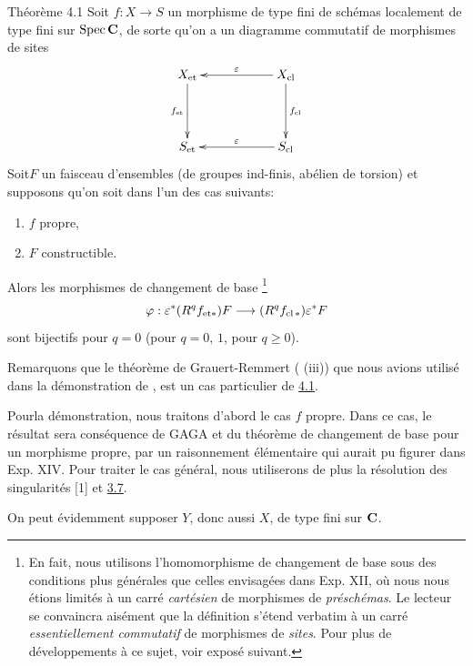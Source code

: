 \documentclass[10pt]{../fichiers-configuration-latex/smfart}
\begin{document}
\begin{enonce*}{Théorème 4.1}
Soit $f:X\rightarrow S$ un morphisme de type fini de schémas
localement de type fini sur $\operatorname{Spec} \mathbf{C}$, de sorte qu'on a un
diagramme commutatif de morphismes de sites
$$
\xymatrix@C=2cm@R=1.5cm{
X_{\et}  \ar[d]_{f_{\et}}                   &   X_{\cl}
\ar[l]_{\varepsilon} \ar[d]^{f_{\cl}} \\
S_{\et}                    &   S_{\cl}\ar[l]_{\varepsilon} 
}
$$
Soit\pageoriginale $F$ un faisceau d'ensembles (\resp de groupes
ind-finis, \resp abélien de torsion) et supposons qu'on soit dans l'un
des cas suivants:
\begin{enumerate}
\renewcommand{\theenumi}{\roman{enumi}}
\renewcommand{\labelenumi}{(\theenumi)}
\item $f$ propre,

\item $F$ constructible.
\end{enumerate}
Alors les morphismes de changement de base 
\footnote[1]{En fait, nous utilisons l'homomorphisme de changement de
base sous des conditions plus générales que celles envisagées dans
Exp. XII, où nous nous étions limités à un carré \emph{cartésien} de
morphismes de \emph{préschémas}. Le lecteur se convaincra aisément que
la définition s'étend verbatim à un carré \emph{essentiellement
commutatif} de morphismes de \emph{sites}. Pour plus de développements
à ce sujet, voir exposé suivant.}
$$
\varphi:\varepsilon^{\ast}(R^{q}f_{\mathrm{et}\ast})F\longrightarrow
(R^{q}f_{\operatorname{cl}\ast})\varepsilon {}^{\ast}F
$$
sont bijectifs pour $q=0$ (\resp pour $q=0$, $1$, \resp pour $q\geq
0$).
\end{enonce*}

Remarquons que le théorème de Grauert-Remmert ( (iii)) que nous
avions utilisé dans la démonstration de , est un cas particulier
de \hyperref[XVI.thm4.1]{4.1}.

Pour\pageoriginale la démonstration, nous traitons d'abord le cas $f$
propre. Dans ce cas, le résultat sera conséquence de GAGA et du
théorème de changement de base pour un morphisme propre, par un
raisonnement élémentaire qui aurait pu figurer dans Exp. XIV. Pour
traiter le cas général, nous utiliserons de plus la résolution des
singularités [1] et \hyperref[XVI.thm3.7]{3.7}.

On peut évidemment supposer $Y$, donc aussi $X$, de type fini sur
$\mathbf{C}$.
\end{document}
